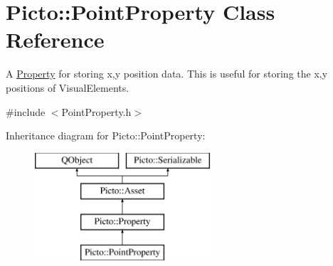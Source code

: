 \hypertarget{class_picto_1_1_point_property}{\section{Picto\-:\-:Point\-Property Class Reference}
\label{class_picto_1_1_point_property}
}


A \hyperlink{class_picto_1_1_property}{Property} for storing x,y position data. This is useful for storing the x,y positions of Visual\-Elements.  




{\ttfamily \#include $<$Point\-Property.\-h$>$}

Inheritance diagram for Picto\-:\-:Point\-Property\-:\begin{figure}[H]
\begin{center}
\leavevmode
\includegraphics[height=4.000000cm]{class_picto_1_1_point_property}
\end{center}
\end{figure}
